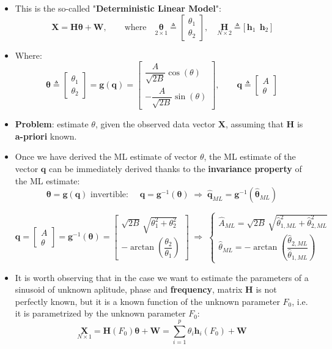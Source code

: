 \begin{itemize}
\item This is the so-called "\textbf{Deterministic Linear Model}":
\[
\mathbf{X} = \mathbf{H}\boldsymbol{\theta} + \mathbf{W},
\qquad
\text{where}\quad
\underset{2 \times 1}{\boldsymbol{\theta}}
\triangleq
\begin{bmatrix}
\theta_{1} \\
\theta_{2}
\end{bmatrix},
\quad
\underset{N \times 2}{\mathbf{H}}
\triangleq
\big[\, \mathbf{h}_{1}\ \ \mathbf{h}_{2} \,\big]
\]
\item Where: 
\[
\boldsymbol{\theta}
\triangleq
\begin{bmatrix}
\theta_{1} \\
\theta_{2}
\end{bmatrix}
=
\mathbf{g}(\mathbf{q})
=
\begin{bmatrix}
\dfrac{A}{\sqrt{2B}}\cos(\theta)\\[5pt]
-\dfrac{A}{\sqrt{2B}}\sin(\theta)
\end{bmatrix},
\qquad
\mathbf{q}
\triangleq
\begin{bmatrix}
A \\
\theta
\end{bmatrix}
\]
\item \textbf{Problem}: estimate \(\theta\), given the observed data vector \(\textbf{X}\), assuming that \textbf{H} is \textbf{a-priori} known.
\item Once we have derived the ML estimate of vector \(\theta\), the ML estimate of the vector \(\textbf{q}\) can be immediately derived thanks to the \textbf{invariance property} of the ML estimate:
\[
\boldsymbol{\theta} = \mathbf{g}(\mathbf{q}) \text{ invertible: }
\quad
\mathbf{q} = \mathbf{g}^{-1}(\boldsymbol{\theta})
\;\Rightarrow\;
\hat{\mathbf{q}}_{ML}
= \mathbf{g}^{-1}(\hat{\boldsymbol{\theta}}_{ML})
\]

\[
\mathbf{q} =
\begin{bmatrix}
A \\[2pt]
\theta
\end{bmatrix}
= \mathbf{g}^{-1}(\boldsymbol{\theta})
=
\begin{bmatrix}
\sqrt{2B}\,\sqrt{\theta_{1}^{2} + \theta_{2}^{2}} \\[4pt]
-\arctan\!\left(\dfrac{\theta_{2}}{\theta_{1}}\right)
\end{bmatrix}
\;\Rightarrow\;
\begin{cases}
\hat{A}_{ML}
= \sqrt{2B}\,\sqrt{\hat{\theta}_{1,ML}^{2} + \hat{\theta}_{2,ML}^{2}} \\[6pt]
\hat{\theta}_{ML}
= -\arctan\!\left(\dfrac{\hat{\theta}_{2,ML}}{\hat{\theta}_{1,ML}}\right)
\end{cases}
\]
\item It is worth observing that in the case we want to estimate the parameters of a sinusoid of unknown aplitude, phase and \textbf{frequency}, matrix \textbf{H} is not perfectly known, but it is a known function of the unknown parameter \(F_0\), i.e. it is parametrized by the unknown parameter \(F_0\):
\[
\underset{N \times 1}{\mathbf{X}}
= \mathbf{H}(F_{0})\boldsymbol{\theta} + \mathbf{W}
= \sum_{i=1}^{p} \theta_{i}\mathbf{h}_{i}(F_{0}) + \mathbf{W}
\]


\end{itemize}
